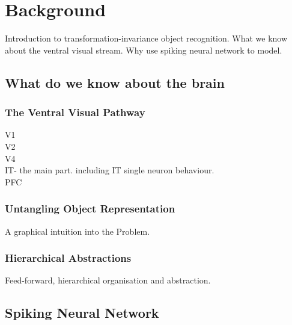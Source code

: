 \chapter{Background}
\label{cha:bkg}

Introduction to transformation-invariance object recognition.
What we know about the ventral visual stream.
Why use spiking neural network to model.
\section{What do we know about the brain}

\label{sec:bio}

\subsection{The Ventral Visual Pathway}
V1\\
V2\\
V4\\
IT- the main part. including IT single neuron behaviour.\\
PFC
\subsection{Untangling Object Representation}
A graphical intuition into the Problem.
\subsection{Hierarchical Abstractions}
Feed-forward, hierarchical organisation and abstraction.


\section{Spiking Neural Network}
\label{sec:pgr}

